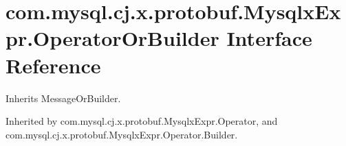\hypertarget{interfacecom_1_1mysql_1_1cj_1_1x_1_1protobuf_1_1_mysqlx_expr_1_1_operator_or_builder}{}\section{com.\+mysql.\+cj.\+x.\+protobuf.\+Mysqlx\+Expr.\+Operator\+Or\+Builder Interface Reference}
\label{interfacecom_1_1mysql_1_1cj_1_1x_1_1protobuf_1_1_mysqlx_expr_1_1_operator_or_builder}


Inherits Message\+Or\+Builder.



Inherited by com.\+mysql.\+cj.\+x.\+protobuf.\+Mysqlx\+Expr.\+Operator, and com.\+mysql.\+cj.\+x.\+protobuf.\+Mysqlx\+Expr.\+Operator.\+Builder.

